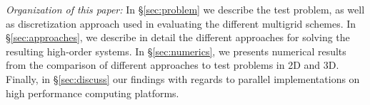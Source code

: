\documentclass[smallcondensed,final]{svjour3}     %
\newcommand{\gsnote}[1]{\textcolor{blue}{GS: #1}}
\begin{document}
{\em Organization of this paper:} In \S\ref{sec:problem} we describe the test 
problem, as well as discretization approach used in evaluating the different 
multigrid schemes. In \S\ref{sec:approaches}, we describe in detail the 
different approaches for solving the resulting high-order systems. In \S\ref{sec:numerics},
we presents numerical results from the comparison of different approaches to
test problems in 2D and 3D. Finally, in \S\ref{sec:discuss} our findings with
regards to parallel implementations on high performance computing platforms. 









\end{document}
